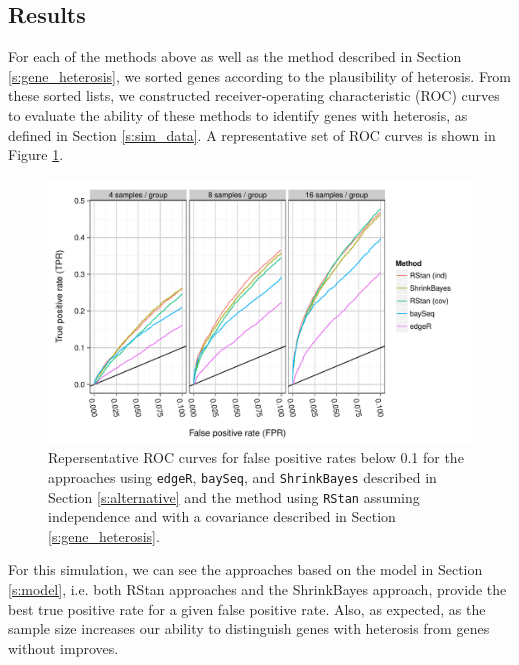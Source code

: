 \documentclass[useAMS,usenatbib,referee]{biom}
\begin{document}
\subsection{Results}


For each of the methods above as well as the method described in Section \ref{s:gene_heterosis}, we sorted genes according to the plausibility of heterosis. From these sorted lists, we constructed receiver-operating characteristic (ROC) curves to evaluate the ability of these methods to identify genes with heterosis, as defined in Section \ref{s:sim_data}. A representative set of ROC curves is shown in Figure \ref{f:roc}. 
\begin{figure}[htbp]
\centerline{\includegraphics[width=\textwidth]{exampleROC0_1}}
\caption{Repersentative ROC curves for false positive rates below 0.1 for the approaches using {\tt edgeR}, {\tt baySeq},  and {\tt ShrinkBayes} described in Section \ref{s:alternative} and the method using {\tt RStan} assuming independence and with a covariance described in Section \ref{s:gene_heterosis}.}
\label{f:roc}
\end{figure}
For this simulation, we can see the approaches based on the model in Section \ref{s:model}, i.e. both RStan approaches and the ShrinkBayes approach, provide the best true positive rate for a given false positive rate. Also, as expected, as the sample size increases our ability to distinguish genes with heterosis from genes without improves.
\end{document}
